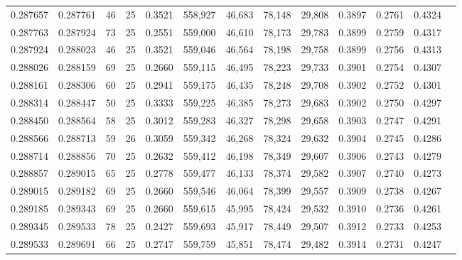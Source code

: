 \begin{tabular}{rrrrrrrrrrrrr}
0.287657 & 0.287761 &    46 &  25 &                                     0.3521 & 558,927 &  46,683 &  78,148 &  29,808 & 0.3897 & 0.2761 & 0.4324 \\
0.287763 & 0.287924 &    73 &  25 &                                     0.2551 & 559,000 &  46,610 &  78,173 &  29,783 & 0.3899 & 0.2759 & 0.4317 \\
0.287924 & 0.288023 &    46 &  25 &                                     0.3521 & 559,046 &  46,564 &  78,198 &  29,758 & 0.3899 & 0.2756 & 0.4313 \\
0.288026 & 0.288159 &    69 &  25 &                                     0.2660 & 559,115 &  46,495 &  78,223 &  29,733 & 0.3901 & 0.2754 & 0.4307 \\
0.288161 & 0.288306 &    60 &  25 &                                     0.2941 & 559,175 &  46,435 &  78,248 &  29,708 & 0.3902 & 0.2752 & 0.4301 \\
0.288314 & 0.288447 &    50 &  25 &                                     0.3333 & 559,225 &  46,385 &  78,273 &  29,683 & 0.3902 & 0.2750 & 0.4297 \\
0.288450 & 0.288564 &    58 &  25 &                                     0.3012 & 559,283 &  46,327 &  78,298 &  29,658 & 0.3903 & 0.2747 & 0.4291 \\
0.288566 & 0.288713 &    59 &  26 &                                     0.3059 & 559,342 &  46,268 &  78,324 &  29,632 & 0.3904 & 0.2745 & 0.4286 \\
0.288714 & 0.288856 &    70 &  25 &                                     0.2632 & 559,412 &  46,198 &  78,349 &  29,607 & 0.3906 & 0.2743 & 0.4279 \\
0.288857 & 0.289015 &    65 &  25 &                                     0.2778 & 559,477 &  46,133 &  78,374 &  29,582 & 0.3907 & 0.2740 & 0.4273 \\
0.289015 & 0.289182 &    69 &  25 &                                     0.2660 & 559,546 &  46,064 &  78,399 &  29,557 & 0.3909 & 0.2738 & 0.4267 \\
0.289185 & 0.289343 &    69 &  25 &                                     0.2660 & 559,615 &  45,995 &  78,424 &  29,532 & 0.3910 & 0.2736 & 0.4261 \\
0.289345 & 0.289533 &    78 &  25 &                                     0.2427 & 559,693 &  45,917 &  78,449 &  29,507 & 0.3912 & 0.2733 & 0.4253 \\
0.289533 & 0.289691 &    66 &  25 &                                     0.2747 & 559,759 &  45,851 &  78,474 &  29,482 & 0.3914 & 0.2731 & 0.4247 \\

\end{tabular}
